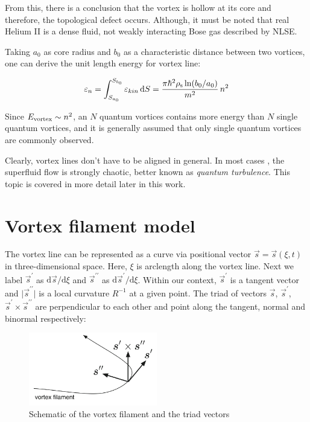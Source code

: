 From this, there is a conclusion that the vortex is hollow at its core and therefore, the topological defect occurs. Although, it must be noted that real Helium II is a dense fluid, not weakly interacting Bose gas described by NLSE.

Taking $a_0$ as core radius and $b_0$ as a characteristic distance between two vortices, one can derive the unit length energy for vortex line:

\begin{equation}
\varepsilon_n
= \int_{S_{a_0}}^{S_{b_0}} \varepsilon_{kin}\,\mathrm{d}S
= \frac{\pi \hbar^2 \rho_{\mathrm{s}} \ln(b_0/a_0)}{m^2}\, n^2
\label{eps_n}
\end{equation}

Since $E_{\mathrm{vortex}} \sim n^2$, an $N$ quantum vortices contains more energy than $N$ single quantum vortices, and it is generally assumed that only single quantum vortices are commonly observed.

Clearly, vortex lines don't have to be aligned in general. In most cases , the superfluid flow is strongly chaotic, better known as \textit{quantum turbulence}. This topic is covered in more detail later in this work.

\newpage

\section{Vortex filament model}

The vortex line can be represented as a curve via positional vector $\vec{s} = \vec{s}(\xi, t)$ in three-dimensional space. Here, $\xi$ is arclength along the vortex line. Next we label $\vec{s}^{\prime}$ as $\text{d}\vec{s} / \text{d} \xi$ and $\vec{s}^{\prime\prime}$ as $\text{d}\vec{s}^{\prime} / \text{d} \xi$.
Within our context, $\vec{s}^{\prime}$ is a tangent vector and $\vert \vec{s}^{\prime\prime} \vert$ is a local curvature $R^{-1}$ at a given point. The triad of vectors $\vec{s}$, $\vec{s}^{\prime}$, $\vec{s}^{\prime} \times \vec{s}^{\prime\prime}$ are perpendicular to each other and point along the tangent, normal and binormal respectively:

\begin{figure}[h]
	\centering
	\includegraphics[width=0.5\textwidth]{graphics/theory/filament}
	\caption{Schematic of the vortex filament and the triad vectors}
	\label{filament}
\end{figure}


